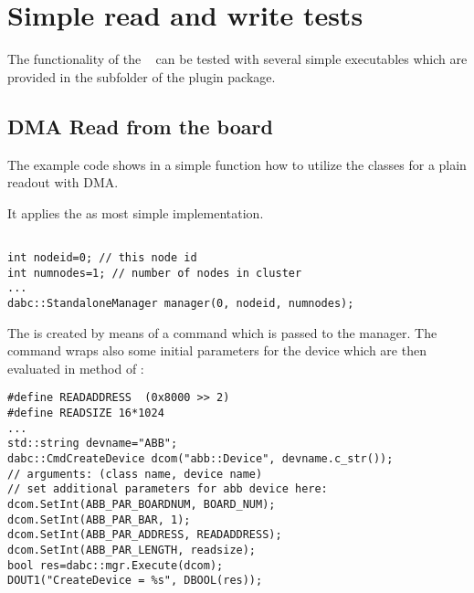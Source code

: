 \section{Simple read and write tests}
\label{prog_exapci_simpletest}
The functionality of the \ABB~ can be tested with several simple
executables which are provided in the  subfolder of the
 plugin package.

\subsection{DMA Read from the board}
\label{prog_exapci_simpletest_read}
The example code  shows in a
simple  function how to utilize the
 classes 
for a plain readout with DMA.
\begin{compactenum} 

\item It applies the  as most simple
 implementation.
\begin{small}
\begin{verbatim}

int nodeid=0; // this node id
int numnodes=1; // number of nodes in cluster
...
dabc::StandaloneManager manager(0, nodeid, numnodes);
\end{verbatim}
\end{small}

\item The  is created by means of a command
 which is passed to the manager. The 
command wraps also some initial
parameters for the device which are then evaluated in 
method  of :

\begin{small}
\begin{verbatim}
#define READADDRESS  (0x8000 >> 2)
#define READSIZE 16*1024
...
std::string devname="ABB";
dabc::CmdCreateDevice dcom("abb::Device", devname.c_str());
// arguments: (class name, device name)
// set additional parameters for abb device here:
dcom.SetInt(ABB_PAR_BOARDNUM, BOARD_NUM);
dcom.SetInt(ABB_PAR_BAR, 1);
dcom.SetInt(ABB_PAR_ADDRESS, READADDRESS);
dcom.SetInt(ABB_PAR_LENGTH, readsize);
bool res=dabc::mgr.Execute(dcom);
DOUT1("CreateDevice = %s", DBOOL(res));
\end{verbatim}
\end{small}


\end{compactenum}
